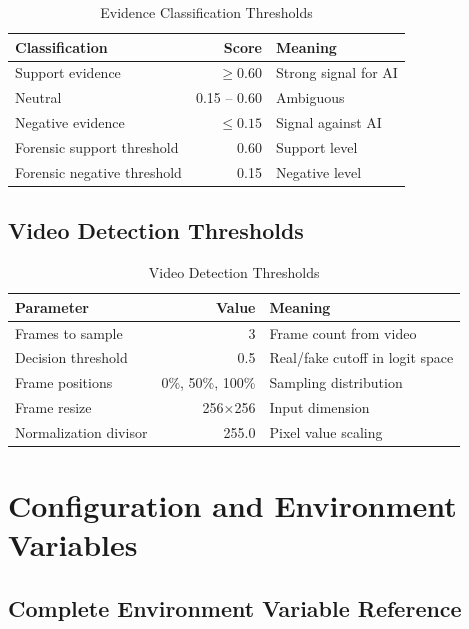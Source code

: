 \documentclass[12pt,a4paper]{book}
\begin{document}
\begin{itemize}
\begin{table}[H]
\centering
\captionsetup{justification=centering}
\caption{Evidence Classification Thresholds}
\begin{tabular}{|l|r|p{4cm}|}
\hline
\textbf{Classification} & \textbf{Score} & \textbf{Meaning} \\
\hline
Support evidence & $\geq 0.60$ & Strong signal for AI \\
\hline
Neutral & 0.15 – 0.60 & Ambiguous \\
\hline
Negative evidence & $\leq 0.15$ & Signal against AI \\
\hline
Forensic support threshold & 0.60 & Support level \\
\hline
Forensic negative threshold & 0.15 & Negative level \\
\hline
\end{tabular}
\end{table}

\section{Video Detection Thresholds}

\begin{table}[H]
\centering
\captionsetup{justification=centering}
\caption{Video Detection Thresholds}
\begin{tabular}{|l|r|p{4cm}|}
\hline
\textbf{Parameter} & \textbf{Value} & \textbf{Meaning} \\
\hline
Frames to sample & 3 & Frame count from video \\
\hline
Decision threshold & 0.5 & Real/fake cutoff in logit space \\
\hline
Frame positions & 0\%, 50\%, 100\% & Sampling distribution \\
\hline
Frame resize & 256×256 & Input dimension \\
\hline
Normalization divisor & 255.0 & Pixel value scaling \\
\hline
\end{tabular}
\end{table}

\chapter{Configuration and Environment Variables}
\label{ch:configuration}

\section{Complete Environment Variable Reference}


\end{itemize}
\end{document}
